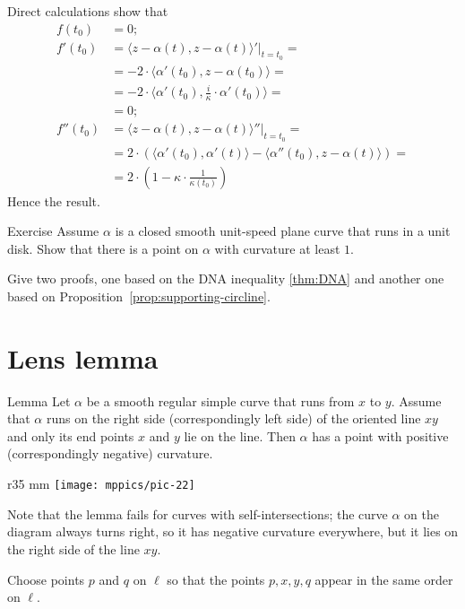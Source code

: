 Direct calculations show that
\begin{align*}
f(t_0)&=0;
\\
f'(t_0)&=\left.\langle z-\alpha(t),z-\alpha(t) \rangle'\right|_{t=t_0}=
\\
&=-2\cdot \langle \alpha'(t_0),z-\alpha(t_0) \rangle=
\\&=-2\cdot \langle \alpha'(t_0),\tfrac i\kappa \cdot\alpha'(t_0) \rangle=
\\
&=0;
\\
f''(t_0)&=\langle z-\alpha(t),z-\alpha(t) \rangle''|_{t=t_0}=
\\
&=2\cdot\left( \langle \alpha'(t_0),\alpha'(t) \rangle-\langle \alpha''(t_0),z-\alpha(t) \rangle \right)=
\\
&=2\cdot\left(1-\kappa\cdot \frac1{\kappa(t_0)}\right)
\end{align*}
Hence the result.\qeds


\begin{thm}{Exercise}
Assume $\alpha$ is a closed smooth unit-speed plane curve that runs in a unit disk.
Show that there is a point on $\alpha$ with curvature at least $1$.

Give two proofs, one based on the DNA inequality \ref{thm:DNA} and another one based on Proposition~\ref{prop:supporting-circline}.
\end{thm}

\section{Lens lemma}

\begin{thm}{Lemma}\label{lem:lens}
Let $\alpha$ be a smooth regular simple curve that runs from $x$ to $y$.
Assume that $\alpha$ runs on the right side (correspondingly left side) of the oriented line $xy$ and only its end points $x$ and $y$ lie on the line.
Then $\alpha$ has a point with positive  (correspondingly negative) curvature.
\end{thm}

\begin{wrapfigure}{r}{35 mm}
\vskip-4mm
\centering
\texttt{[image: mppics/pic-22]}
\vskip0mm
\end{wrapfigure}

Note that the lemma fails for curves with self-intersections;
the curve $\alpha$ on the diagram always turns right, 
so it has negative curvature everywhere, but it lies on the right side of the line $xy$. 

Choose points $p$ and $q$ on $\ell$
so that the points $p, x, y, q$ appear in the same order on $\ell$.

